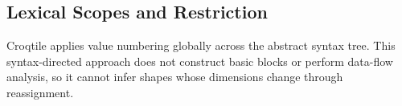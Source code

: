 \subsection*{Lexical Scopes and Restriction}

Croqtile applies value numbering globally across the abstract syntax tree. This syntax-directed approach does not construct basic blocks or perform data-flow analysis, so it cannot infer shapes whose dimensions change through reassignment.
